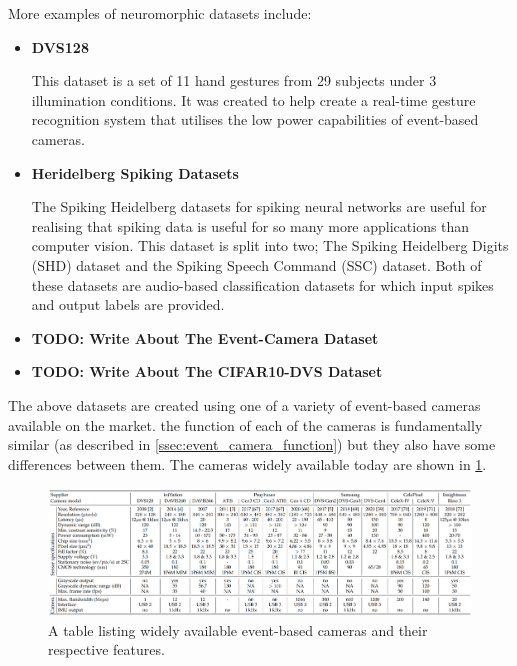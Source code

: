 More examples of neuromorphic datasets include:

\begin{itemize}
      \item \textbf{DVS128}

            This dataset is a set of 11 hand gestures from 29 subjects under 3 illumination conditions. It was created to help create a real-time gesture recognition system that utilises the low power capabilities of event-based cameras\cite{DVS128}.
      \item \textbf{Heridelberg Spiking Datasets}

            The Spiking Heidelberg datasets for spiking neural networks\cite{SpikingHeidelberg} are useful for realising that spiking data is useful for so many more applications than computer vision. This dataset is split into two; The Spiking Heidelberg Digits (SHD) dataset and the Spiking Speech Command (SSC) dataset. Both of these datasets are audio-based classification datasets for which input spikes and output labels are provided.
      
      \item \color{red} \textbf{TODO: Write About The Event-Camera Dataset} \color{black}
      
      \item \color{red} \textbf{TODO: Write About The CIFAR10-DVS Dataset} \color{black}
\end{itemize}

The above datasets are created using one of a variety of event-based cameras available on the market. the function of each of the cameras is fundamentally similar (as described in \cref{ssec:event_camera_function}) but they also have some differences between them. The cameras widely available today are shown in \cref{fig:camera_models}.

\begin{figure}[htb]
      \centering
      \includegraphics[width=\textwidth]{background/images/camera_models.png}
      \caption{A table listing widely available event-based cameras and their respective features\cite{EventBasedVisionASurvery}.}
      \label{fig:camera_models}
\end{figure}

